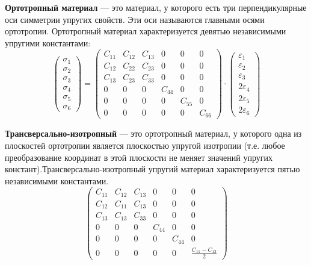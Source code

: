 \textbf{Ортотропный материал} --- это материал, у которого есть три перпендикулярные оси симметрии упругих свойств. Эти оси называются главными осями ортотропии. Ортотропный материал характеризуется девятью независимыми упругими константами:
$$
\left(\begin{array}{l}
\sigma_1 \\
\sigma_2 \\
\sigma_3 \\
\sigma_4 \\
\sigma_5 \\
\sigma_6
\end{array}\right)=\left(\begin{array}{cccccc}
C_{11} & C_{12} & C_{13} & 0 & 0 & 0 \\
C_{12} & C_{22} & C_{23} & 0 & 0 & 0 \\
C_{13} & C_{23} & C_{33} & 0 & 0 & 0 \\
0 & 0 & 0 & C_{44} & 0 & 0 \\
0 & 0 & 0 & 0 & C_{55} & 0 \\
0 & 0 & 0 & 0 & 0 & C_{66}
\end{array}\right) \cdot\left(\begin{array}{c}
\varepsilon_1 \\
\varepsilon_2 \\
\varepsilon_3 \\
2 \varepsilon_4 \\
2 \varepsilon_5 \\
2 \varepsilon_6
\end{array}\right)
$$


\textbf{Трансверсально-изотропный} –-- это ортотропный материал, у которого одна из плоскостей
ортотропии является плоскостью упругой изотропии (т.е. любое преобразование координат в этой
плоскости не меняет значений упругих констант).Трансверсально-изотропный упругий материал характеризуется пятью независимыми константами. 
$$
\left(\begin{array}{cccccc}
C_{11} & C_{12} & C_{13} & 0 & 0 & 0 \\
C_{12} & C_{11} & C_{13} & 0 & 0 & 0 \\
C_{13} & C_{13} & C_{33} & 0 & 0 & 0 \\
0 & 0 & 0 & C_{44} & 0 & 0 \\
0 & 0 & 0 & 0 & C_{44} & 0 \\
0 & 0 & 0 & 0 & 0 & \frac{C_{11}-C_{12}}{2}
\end{array}\right)
$$


